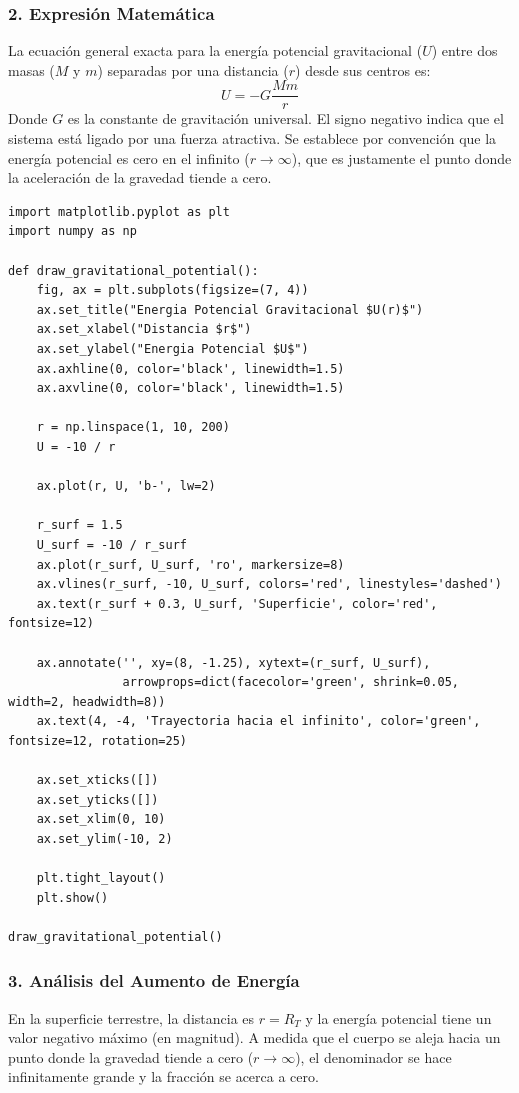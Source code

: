\documentclass[12pt, a4paper]{article}
\begin{document}
\subsubsection*{2. Expresión Matemática}
La ecuación general exacta para la energía potencial gravitacional ($U$) entre dos masas ($M$ y $m$) separadas por una distancia ($r$) desde sus centros es:
$$U = -G \frac{M m}{r}$$
Donde $G$ es la constante de gravitación universal. El signo negativo indica que el sistema está ligado por una fuerza atractiva. Se establece por convención que la energía potencial es cero en el infinito ($r \to \infty$), que es justamente el punto donde la aceleración de la gravedad tiende a cero.

\begin{lstlisting}
import matplotlib.pyplot as plt
import numpy as np

def draw_gravitational_potential():
    fig, ax = plt.subplots(figsize=(7, 4))
    ax.set_title("Energia Potencial Gravitacional $U(r)$")
    ax.set_xlabel("Distancia $r$")
    ax.set_ylabel("Energia Potencial $U$")
    ax.axhline(0, color='black', linewidth=1.5)
    ax.axvline(0, color='black', linewidth=1.5)
    
    r = np.linspace(1, 10, 200)
    U = -10 / r
    
    ax.plot(r, U, 'b-', lw=2)
    
    r_surf = 1.5
    U_surf = -10 / r_surf
    ax.plot(r_surf, U_surf, 'ro', markersize=8)
    ax.vlines(r_surf, -10, U_surf, colors='red', linestyles='dashed')
    ax.text(r_surf + 0.3, U_surf, 'Superficie', color='red', fontsize=12)
    
    ax.annotate('', xy=(8, -1.25), xytext=(r_surf, U_surf),
                arrowprops=dict(facecolor='green', shrink=0.05, width=2, headwidth=8))
    ax.text(4, -4, 'Trayectoria hacia el infinito', color='green', fontsize=12, rotation=25)
    
    ax.set_xticks([])
    ax.set_yticks([])
    ax.set_xlim(0, 10)
    ax.set_ylim(-10, 2)
    
    plt.tight_layout()
    plt.show()

draw_gravitational_potential()
\end{lstlisting}

\subsubsection*{3. Análisis del Aumento de Energía}
En la superficie terrestre, la distancia es $r = R_T$ y la energía potencial tiene un valor negativo máximo (en magnitud). A medida que el cuerpo se aleja hacia un punto donde la gravedad tiende a cero ($r \to \infty$), el denominador se hace infinitamente grande y la fracción se acerca a cero.
\end{document}

